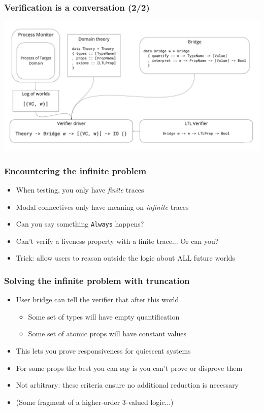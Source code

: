 \documentclass[12pt,aspectratio=169]{beamer}
\begin{document}
\begin{frame}
\frametitle{Verification is a conversation (2/2)}
  \includegraphics[scale=0.27]{diagram.jpg}
  \centering
\end{frame}

\begin{frame}
\frametitle{Encountering the infinite problem}
\begin{itemize}
  \item When testing, you only have \textit{finite} traces
  \item Modal connectives only have meaning on \textit{infinite} traces
  \item Can you say something \texttt{Always} happens?
  \item Can't verify a liveness property with a finite trace... Or can you?
  \item Trick: allow users to reason outside the logic about ALL future worlds
\end{itemize}
\end{frame}

\begin{frame}
\frametitle{Solving the infinite problem with truncation}
\begin{itemize}
  \item User bridge can tell the verifier that after this world
  \begin{itemize}
    \item Some set of types will have empty quantification
    \item Some set of atomic props will have constant values
  \end{itemize}
  \item This lets you prove responsiveness for quiescent systems
  \item For some props the best you can say is you can't prove or disprove them
  \item Not arbitrary: these criteria ensure no additional reduction is necessary
  \item (Some fragment of a higher-order 3-valued logic...)
\end{itemize}
\end{frame}
\end{document}
